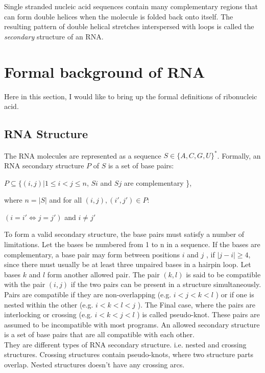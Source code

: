 \documentclass[twoside,a4paper]{report}
\numberwithin{equation}{section}
\begin{document}
	Single stranded nucleic acid sequences contain many complementary regions that can form double helices when the molecule is folded back onto itself. The resulting pattern of double helical stretches interspersed with loops is called the \textit{secondary} structure of an RNA.\\
	
	\section{Formal background of RNA}
	Here in this section, I would like to bring up the formal definitions of ribonucleic acid.
	\subsection{RNA Structure}
	The RNA molecules are represented as a sequence $S \in \{A, C, G, U\} ^*$.
	Formally, an RNA secondary structure $P$ of $S$ is a set of base pairs:\\
	\begin{center}
	 $ P \subseteq \{(i, j) | 1 \leq i < j \leq n $, $ Si $ and $Sj$ are complementary \},\\
	\end{center}
	where $ n = |S| $ and for all $(i, j) , ( i', j' ) \in  P:$\\
	\begin{center}
	$(i = i' \Leftrightarrow j = j')$ and $ i \neq j'$ \\
	\end{center}

	To form a valid secondary structure, the base pairs must satisfy a number of limitations. Let the bases be numbered from 1 to n in a sequence. If the bases are complementary, a base pair may form between positions $i$ and $j$ ,  if $|j - i | \geq 4$, since there must usually be at least three unpaired bases in a hairpin loop. Let bases $k$ and $l$ form another allowed pair. The pair $(k,l)$ is said to be compatible with the pair $(i,j)$ if the two pairs can be present in a structure simultaneously. Pairs are compatible if they are non-overlapping (e.g. $i<j<k<l$ ) or if one is nested within the other (e.g. $i<k<l<j$ ). The Final case, where the pairs are interlocking or crossing (e.g. $i<k<j<l$ ) is called  pseudo-knot. These pairs are assumed to be incompatible with
	most programs. An allowed secondary structure is a set of base pairs that are all compatible with each other.\\
	
	They are different types of RNA secondary structure. i.e. nested
	and crossing structures. Crossing structures contain pseudo-knots, where two structure parts overlap. Nested structures doesn't have any crossing arcs.\\
	
\end{document}
